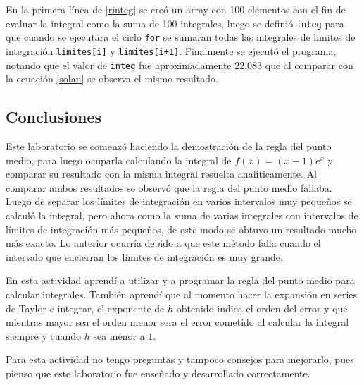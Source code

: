 \documentclass[../portafolio.tex]{subfiles}
\begin{document}
En la primera línea de \ref{rinteg} se creó un array con 100 elementos con el fin de evaluar la integral como la suma de 100 integrales, luego se definió \texttt{integ} para que cuando se ejecutara el ciclo \texttt{for} se sumaran todas las integrales de limites de integración \texttt{limites[i]} y \texttt{limites[i+1]}. Finalmente se ejecutó el programa, notando que el valor de \texttt{integ} fue aproximadamente $22.083$ que al comparar con la ecuación \ref{solan}  se observa el mismo resultado.


\subsection{Conclusiones}

Este laboratorio se comenzó haciendo la demostración de la regla del punto medio, para luego ocuparla calculando la integral de $f(x)= (x-1)e^x$ y comparar su resultado con la misma integral resuelta analíticamente. Al comparar ambos resultados se observó que la regla del punto medio fallaba. Luego de separar los límites de integración en varios intervalos muy pequeños se calculó la integral, pero ahora como la suma de varias integrales con intervalos de límites de integración más pequeños, de este modo se obtuvo un resultado mucho más exacto. Lo anterior ocurría debido a que este método falla cuando el intervalo que encierran los límites de integración es muy grande.

\vspace{2mm}
En esta actividad aprendí a utilizar y a programar la regla del punto medio para calcular integrales. También aprendí que al momento hacer la expansión en series de Taylor e integrar, el exponente de $h$ obtenido indica el orden del error y que mientras mayor sea el orden menor sera el error cometido al calcular la integral siempre y cuando $h$ sea menor a $1$.

\vspace{2mm}
Para esta actividad no tengo preguntas y tampoco consejos para mejorarlo, pues pienso que este laboratorio fue enseñado y desarrollado correctamente. 
\end{document}
